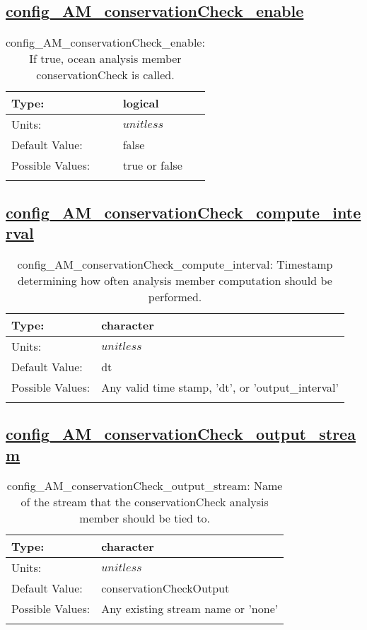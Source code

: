 \subsection[config\_AM\_conservationCheck\_enable]{\hyperref[sec:nm_tab_AM_conservationCheck]{config\_AM\_conservationCheck\_enable}}
\label{subsec:nm_sec_config_AM_conservationCheck_enable}
\begin{center}
\begin{longtable}{| p{2.0in} || p{4.0in} |}
    \hline
    Type: & logical \\
    \hline
    Units: & $unitless$ \\
    \hline
    Default Value: & false \\
    \hline
    Possible Values: & true or false \\
    \hline
    \caption{config\_AM\_conservationCheck\_enable: If true, ocean analysis member conservationCheck is called.}
\end{longtable}
\end{center}
\subsection[config\_AM\_conservationCheck\_compute\_interval]{\hyperref[sec:nm_tab_AM_conservationCheck]{config\_AM\_conservationCheck\_compute\_interval}}
\label{subsec:nm_sec_config_AM_conservationCheck_compute_interval}
\begin{center}
\begin{longtable}{| p{2.0in} || p{4.0in} |}
    \hline
    Type: & character \\
    \hline
    Units: & $unitless$ \\
    \hline
    Default Value: & dt \\
    \hline
    Possible Values: & Any valid time stamp, 'dt', or 'output\_interval' \\
    \hline
    \caption{config\_AM\_conservationCheck\_compute\_interval: Timestamp determining how often analysis member computation should be performed.}
\end{longtable}
\end{center}
\subsection[config\_AM\_conservationCheck\_output\_stream]{\hyperref[sec:nm_tab_AM_conservationCheck]{config\_AM\_conservationCheck\_output\_stream}}
\label{subsec:nm_sec_config_AM_conservationCheck_output_stream}
\begin{center}
\begin{longtable}{| p{2.0in} || p{4.0in} |}
    \hline
    Type: & character \\
    \hline
    Units: & $unitless$ \\
    \hline
    Default Value: & conservationCheckOutput \\
    \hline
    Possible Values: & Any existing stream name or 'none' \\
    \hline
    \caption{config\_AM\_conservationCheck\_output\_stream: Name of the stream that the conservationCheck analysis member should be tied to.}
\end{longtable}
\end{center}
